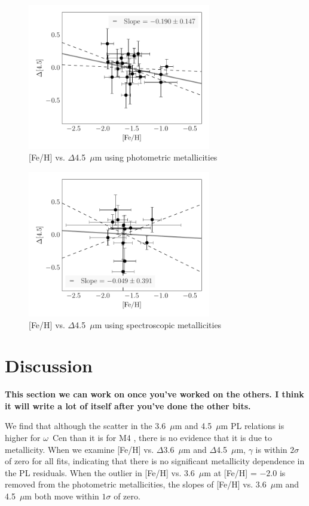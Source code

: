 \documentclass[a4paper,fleqn,usenatbib]{mnras}
\begin{document}
\begin{figure}
\begin{center}
\includegraphics[width=80mm]{final_plots/delta_feh_4p5_phot.pdf}
\caption{[Fe/H] vs. $\Delta$4.5~$\mu$m using photometric metallicities}
\label{fig:delta_4p5_phot}
\end{center}
\end{figure}

\begin{figure}
\begin{center}
\includegraphics[width=80mm]{final_plots/delta_feh_4p5_spect.pdf}
\caption{[Fe/H] vs. $\Delta$4.5~$\mu$m using spectroscopic metallicities}
\label{fig:delta_4p5_spect}
\end{center}
\end{figure}


\section{Discussion}
\label{sec:discussion}

{\bf This section we can work on once you've worked on the others. I think it will write a lot of itself after you've done the other bits.}

We find that although the scatter in the 3.6~$\mu$m and 4.5~$\mu$m PL relations is higher for $\omega$~Cen than it is for M4 \citep{2015arXiv150507858N}, there is no evidence that it is due to metallicity. When we examine [Fe/H] vs. $\Delta$3.6~$\mu$m and $\Delta$4.5~$\mu$m, $\gamma$ is within $2\sigma$ of zero for all fits, indicating that there is no significant metallicity dependence in the PL residuals. When the outlier in [Fe/H] vs. 3.6~$\mu$m at [Fe/H] = $-2.0$ is removed from the photometric metallicities, the slopes of [Fe/H] vs. 3.6~$\mu$m and 4.5~$\mu$m both move within $1\sigma$ of zero.
\end{document}
